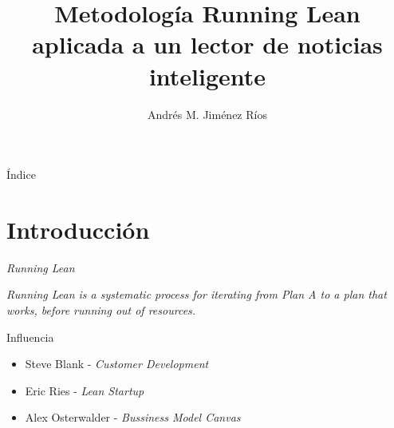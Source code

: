 \documentclass[12pt]{beamer}
\title[Running Lean en un lector RSS]{Metodología Running Lean aplicada a un lector de noticias inteligente}
\author{Andrés M. Jiménez Ríos}
\institute[TFM]{Trabajo Fin de Máster}
\begin{document}
	\frame{\titlepage}
	
	\begin{frame}{Índice}
		\tableofcontents
	\end{frame}

	\section{Introducción}
		\begin{frame}{\textit{Running Lean}}
			\begin{block}{}
				\textit{Running Lean is a systematic process for iterating from Plan A to a plan that works, before running out of resources.}
			\end{block}
			\begin{block}{Influencia}
				\begin{itemize}
                    \item Steve Blank - \textit{Customer Development}
                    \item Eric Ries - \textit{Lean Startup}
                    \item Alex Osterwalder - \textit{Bussiness Model Canvas}
                \end{itemize}
			\end{block}
		\end{frame}
		
		{
			\begin{frame}[plain]
			\end{frame}
		}
	
\end{document}
